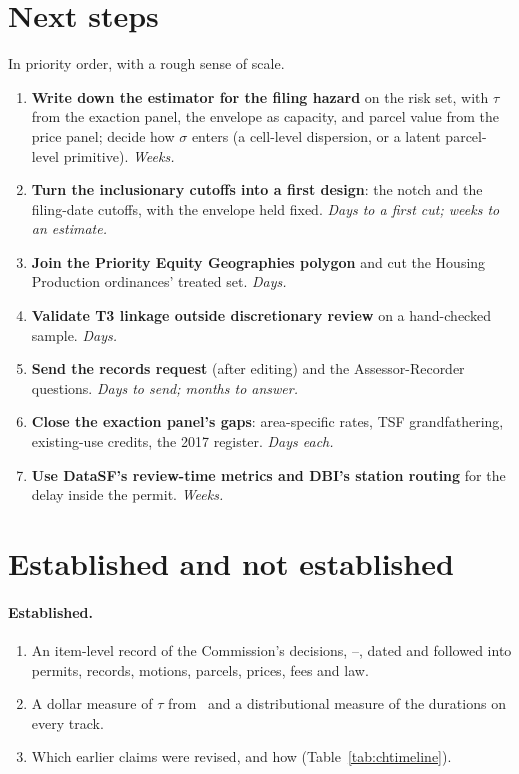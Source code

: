 \documentclass[11pt]{article}
\begin{document}
\section{Next steps}\label{sec:chnext}

In priority order, with a rough sense of scale.
\begin{enumerate}
\item \textbf{Write down the estimator for the filing hazard} on the risk set, with $\tau$ from the
exaction panel, the envelope as capacity, and parcel value from the price panel; decide how
$\sigma$ enters (a cell-level dispersion, or a latent parcel-level primitive). \emph{Weeks.}
\item \textbf{Turn the inclusionary cutoffs into a first design}: the notch and the filing-date
cutoffs, with the envelope held fixed. \emph{Days to a first cut; weeks to an estimate.}
\item \textbf{Join the Priority Equity Geographies polygon} and cut the Housing Production
ordinances' treated set. \emph{Days.}
\item \textbf{Validate T3 linkage outside discretionary review} on a hand-checked sample. \emph{Days.}
\item \textbf{Send the records request} (after editing) and the Assessor-Recorder questions.
\emph{Days to send; months to answer.}
\item \textbf{Close the exaction panel's gaps}: area-specific rates, TSF grandfathering,
existing-use credits, the 2017 register. \emph{Days each.}
\item \textbf{Use DataSF's review-time metrics and DBI's station routing} for the delay inside
the permit. \emph{Weeks.}
\end{enumerate}

\section{Established and not established}\label{sec:chest}

\paragraph{Established.}
\begin{enumerate}
\item An item-level record of the Commission's decisions, \chItemFirst--\chItemLast, dated and
followed into permits, records, motions, parcels, prices, fees and law.
\item A dollar measure of $\tau$ from \exRegFirst\ and a distributional measure of the durations
on every track.
\item Which earlier claims were revised, and how (Table~\ref{tab:chtimeline}).
\end{enumerate}
\end{document}
